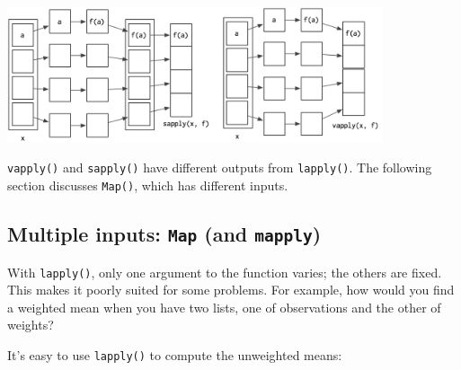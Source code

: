 \includegraphics[width=4.35in]{diagrams/sapply-vapply.png}

\texttt{vapply()} and \texttt{sapply()} have different outputs from
\texttt{lapply()}. The following section discusses \texttt{Map()}, which
has different inputs.

\subsection{Multiple inputs: \texttt{Map} (and
\texttt{mapply})}\label{map}

With \texttt{lapply()}, only one argument to the function varies; the
others are fixed. This makes it poorly suited for some problems. For
example, how would you find a weighted mean when you have two lists, one
of observations and the other of weights? 

\begin{Shaded}
\begin{Highlighting}[]
\StringTok{ }\NormalTok{(}\NormalTok{, }\NormalTok{(}\NormalTok{), } \NormalTok{)}
\StringTok{ }\NormalTok{(}\NormalTok{, }\NormalTok{(}\NormalTok{, }\NormalTok{) +}\StringTok{ }\NormalTok{, } \NormalTok{)}
\end{Highlighting}
\end{Shaded}

It's easy to use \texttt{lapply()} to compute the unweighted means:

\begin{Shaded}
\begin{Highlighting}[]
\NormalTok{(}
\end{Highlighting}
\end{Shaded}


